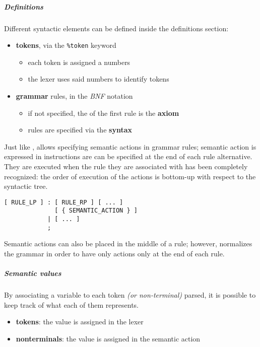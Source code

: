 \documentclass[english]{article}
\begin{document}
\subparagraph*{Definitions}
Different syntactic elements can be defined inside the definitions section:
\begin{itemize}
  \item \textbf{tokens}, via the \texttt{\%token} keyword
        \begin{itemize}
          \item each token is assigned a numbers
          \item the lexer uses said numbers to identify tokens
        \end{itemize}
  \item \textbf{grammar} rules, in the \textit{BNF} notation
        \begin{itemize}
          \item if not specified, the \LP of the first rule is the \textbf{axiom}
          \item rules are specified via the \textbf{syntax}
        \end{itemize}
\end{itemize}

Just like \flex, \bison allows specifying semantic actions in grammar rules;
semantic action is expressed in \clang instructions are can be specified at the end of each rule alternative.
They are executed when the rule they are associated with has been completely recognized:
the order of execution of the actions is bottom-up with respect to the syntactic tree.

\begin{onepage}
  \begin{lstlisting}[caption={Definition section of a \bison file}, label={lst:bison-definition-section}]
[ RULE_LP ] : [ RULE_RP ] [ ... ]
              [ { SEMANTIC_ACTION } ]
            | [ ... ]
            ;
\end{lstlisting}
\end{onepage}

Semantic actions can also be placed in the middle of a rule;
however, \bison normalizes the grammar in order to have only actions only at the end of each rule.

\subparagraph*{Semantic values}

By associating a variable to each token \textit{(or non-terminal)} parsed, it is possible to keep track of what each of them represents.

\begin{itemize}
  \item \textbf{tokens}: the value is assigned in the lexer
  \item \textbf{nonterminals}: the value is assigned in the semantic action
\end{itemize}
\end{document}
